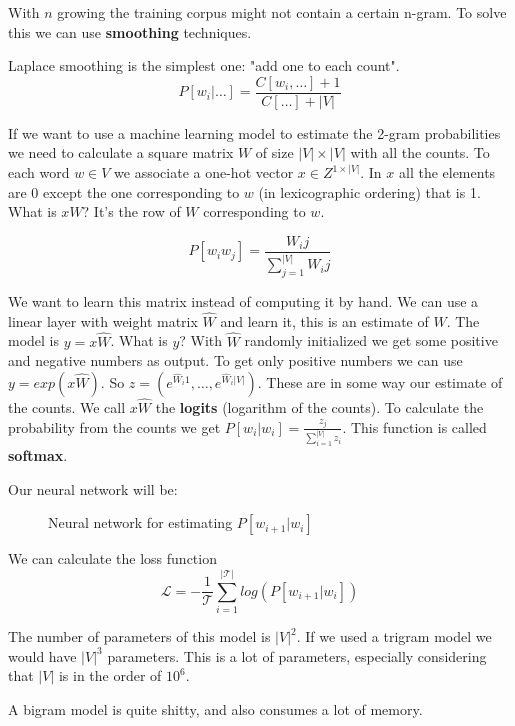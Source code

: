 With $n$ growing the training corpus might not contain a certain n-gram.
To solve this we can use \textbf{smoothing} techniques.

Laplace smoothing is the simplest one: "add one to each count".
\[
    P[w_i|\dots]=\frac{C[w_i,\dots]+1}{C[\dots]+|V|}
\]

If we want to use a machine learning model to estimate the 2-gram probabilities we need to
calculate a square matrix $W$ of size $|V|\times|V|$ with all the counts.
To each word $w\in V$ we associate a one-hot vector $x\in Z^{1\times |V|}$.
In $x$ all the elements are 0 except the one corresponding to $w$ (in lexicographic ordering) that is 1.
What is $xW$? It's the row of $W$ corresponding to $w$.

\[
    P[w_i w_j]=\frac{W_ij}{\sum_{j=1}^{|V|}W_ij}
\]

We want to learn this matrix instead of computing it by hand.
We can use a linear layer with weight matrix $\hat{W}$ and learn it, this is an estimate of $W$.
The model is $y=x\hat{W}$. What is $y$? With $\hat{W}$ randomly initialized we get some positive and negative numbers as output.
To get only positive numbers we can use $y=exp(x\hat{W})$. So
$z=(e^{\hat{W}_i1},\dots,e^{\hat{W}_i|V|})$. These are in some way our estimate of the counts.
We call $x\hat{W}$ the \textbf{logits} (logarithm of the counts).
To calculate the probability from the counts we get $P[w_i|w_i]=\frac{z_j}{\sum_{i=1}^{|V|}z_i}$.
This function is called \textbf{softmax}.

Our neural network will be:

\begin{figure}[H]
    \centering
    \caption{Neural network for estimating $P[w_{i+1}|w_i]$}
    \label{fig:neural_network}
\end{figure}

We can calculate the loss function
\[
    \mathcal{L}=-\frac{1}{\mathcal{T}}\sum_{i=1}^{|\mathcal{T}|}log(P[w_{i+1}|w_i])
\]

The number of parameters of this model is $|V|^2$. 
If we used a trigram model we would have $|V|^3$ parameters.
This is a lot of parameters, especially considering that $|V|$ is 
in the order of $10^6$. 

A bigram model is quite shitty, and also consumes a lot of memory.